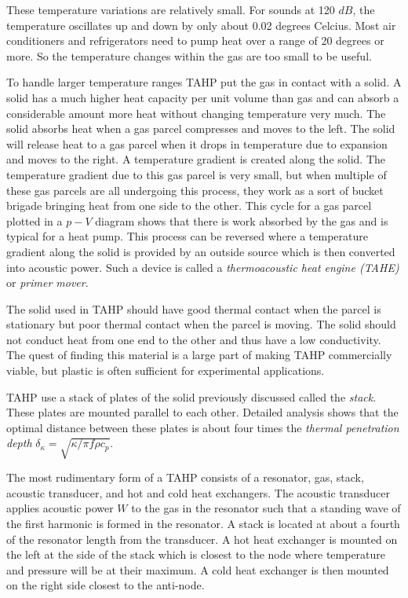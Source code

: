 \documentclass{article}
\begin{document}
These temperature variations are relatively small. For sounds at 120 \(dB\), the temperature oscillates up and down by only about 0.02 degrees Celcius. Most air conditioners and refrigerators need to pump heat over a range of 20 degrees or more. So the temperature changes within the gas are too small to be useful.

To handle larger temperature ranges TAHP put the gas in contact with a solid. A solid has a much higher heat capacity per unit volume than gas and can absorb a considerable amount more heat without changing temperature very much. The solid absorbs heat when a gas parcel compresses and moves to the left. The solid will release heat to a gas parcel when it drops in temperature due to expansion and moves to the right. A temperature gradient is created along the solid. The temperature gradient due to this gas parcel is very small, but when multiple of these gas parcels are all undergoing this process, they work as a sort of bucket brigade bringing heat from one side to the other. %
This cycle for a gas parcel plotted in a \(p-V\) diagram shows that there is work absorbed by the gas and is typical for a heat pump.  %
This process can be reversed where a temperature gradient along the solid is provided by an outside source which is then converted into acoustic power. Such a device is called a \emph{thermoacoustic heat engine (TAHE)} or \emph{primer mover}.

The solid used in TAHP should have good thermal contact when the parcel is stationary but poor thermal contact when the parcel is moving. The solid should not conduct heat from one end to the other and thus have a low conductivity. The quest of finding this material is a large part of making TAHP commercially viable, but plastic is often sufficient for experimental applications.

TAHP use a stack of plates of the solid previously discussed called the \emph{stack}. These plates are mounted parallel to each other. Detailed analysis shows that the optimal distance between these plates is about four times the \emph{thermal penetration depth} \(\delta_\kappa = \sqrt{\kappa/\pi f \rho c_p}\). %

The most rudimentary form of a TAHP consists of a resonator, gas, stack, acoustic transducer, and hot and cold heat exchangers. The acoustic transducer applies acoustic power \(W\) to the gas in the resonator such that a standing wave of the first harmonic is formed in the resonator. A stack is located at about a fourth of the resonator length from the transducer. A hot heat exchanger is mounted on the left at the side of the stack which is closest to the node where temperature and pressure will be at their maximum. A cold heat exchanger is then mounted on the right side closest to the anti-node.
\end{document}
